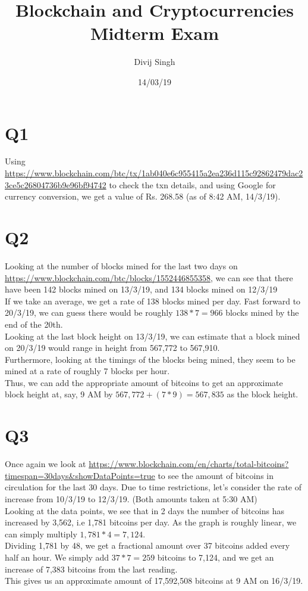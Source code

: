 \documentclass{article}
\title{Blockchain and Cryptocurrencies Midterm Exam}
\author{Divij Singh}
\date{14/03/19}
\begin{document}
	\maketitle
	
	\section{Q1}
Using \url{https://www.blockchain.com/btc/tx/1ab040e6c955415a2ea236d115c92862479dac23ce5c26804736b9e96bf94742} to check the txn details, and using Google for currency conversion, we get a value of Rs. 268.58 (as of 8:42 AM, 14/3/19).

\section{Q2}
Looking at the number of blocks mined for the last two days on \url{https://www.blockchain.com/btc/blocks/1552446855358}, we can see that there have been 142 blocks mined on 13/3/19, and 134 blocks mined on 12/3/19\\
If we take an average, we get a rate of 138 blocks mined per day. Fast forward to 20/3/19, we can guess there would be roughly $138*7 = 966$ blocks mined by the end of the 20th.\\ 
Looking at the last block height on 13/3/19, we can estimate that a block mined on 20/3/19 would range in height from 567,772 to  567,910.\\
Furthermore, looking at the timings of the blocks being mined, they seem to be mined at a rate of roughly 7 blocks per hour.\\
Thus, we can add the appropriate amount of bitcoins to get an approximate block height at, say, 9 AM by $567,772 + (7*9) = 567,835$ as the block height.

\section{Q3}
Once again we look at \url{https://www.blockchain.com/en/charts/total-bitcoins?timespan=30days&showDataPoints=true} to see the amount of bitcoins in circulation for the last 30 days. Due to time restrictions, let's consider the rate of increase from 10/3/19 to 12/3/19. (Both amounts taken at 5:30 AM)\\
Looking at the data points, we see that in 2 days the number of bitcoins has increased by 3,562, i.e 1,781 bitcoins per day. As the graph is roughly linear, we can simply multiply $1,781*4 = 7,124$.\\
Dividing 1,781 by 48, we get a fractional amount over 37 bitcoins added every half an hour. We simply add $37*7 = 259$ bitcoins to 7,124, and we get an increase of 7,383 bitcoins from the last reading.\\
This gives us an approximate amount of 17,592,508 bitcoins at 9 AM on 16/3/19.
\end{document}
